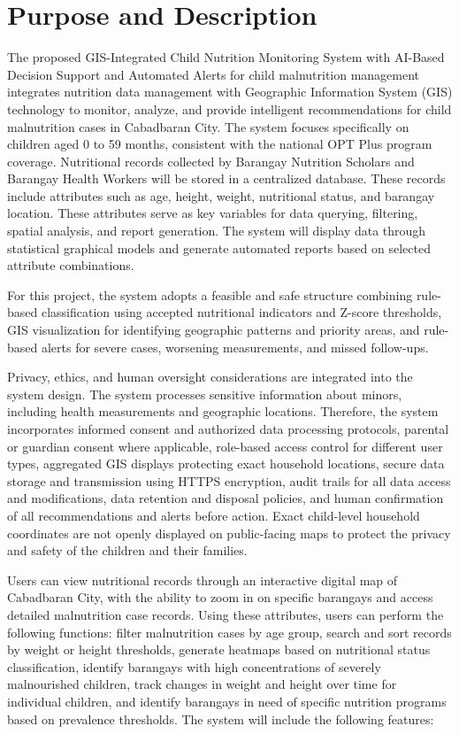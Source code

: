 \documentclass[12pt, a4paper]{report}
\begin{document}
\section{Purpose and Description}
\label{sec:purpose}
The proposed GIS-Integrated Child Nutrition Monitoring System with AI-Based Decision Support and Automated Alerts for child malnutrition management integrates nutrition data management with Geographic Information System (GIS) technology to monitor, analyze, and provide intelligent recommendations for child malnutrition cases in Cabadbaran City. The system focuses specifically on children aged 0 to 59 months, consistent with the national OPT Plus program coverage. Nutritional records collected by Barangay Nutrition Scholars and Barangay Health Workers will be stored in a centralized database. These records include attributes such as age, height, weight, nutritional status, and barangay location. These attributes serve as key variables for data querying, filtering, spatial analysis, and report generation. The system will display data through statistical graphical models and generate automated reports based on selected attribute combinations.

For this project, the system adopts a feasible and safe structure combining rule-based classification using accepted nutritional indicators and Z-score thresholds, GIS visualization for identifying geographic patterns and priority areas, and rule-based alerts for severe cases, worsening measurements, and missed follow-ups.

Privacy, ethics, and human oversight considerations are integrated into the system design. The system processes sensitive information about minors, including health measurements and geographic locations. Therefore, the system incorporates informed consent and authorized data processing protocols, parental or guardian consent where applicable, role-based access control for different user types, aggregated GIS displays protecting exact household locations, secure data storage and transmission using HTTPS encryption, audit trails for all data access and modifications, data retention and disposal policies, and human confirmation of all recommendations and alerts before action. Exact child-level household coordinates are not openly displayed on public-facing maps to protect the privacy and safety of the children and their families.

Users can view nutritional records through an interactive digital map of Cabadbaran City, with the ability to zoom in on specific barangays and access detailed malnutrition case records. Using these attributes, users can perform the following functions: filter malnutrition cases by age group, search and sort records by weight or height thresholds, generate heatmaps based on nutritional status classification, identify barangays with high concentrations of severely malnourished children, track changes in weight and height over time for individual children, and identify barangays in need of specific nutrition programs based on prevalence thresholds. The system will include the following features:
\end{document}
